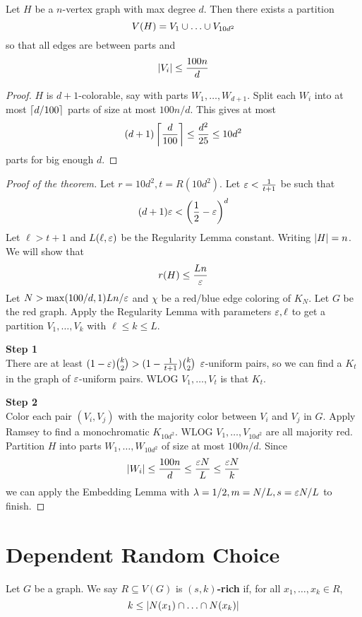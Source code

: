 \documentclass{article}
\begin{document}
\newlec

\begin{lem}
  Let $H$ be a $n$-vertex graph with max degree $d$. Then there exists a partition
  $$V(H) = V_1 \union \dots \union V_{10d^2}$$
  so that all edges are between parts and
  $$\left\lvert V_i\right\rvert \le \frac{100n}d$$
\end{lem}
\begin{proof}
  $H$ is $d + 1$-colorable, say with parts $W_1, \dots, W_{d + 1}$. Split each $W_i$ into at most $\left\lceil d/100\right\rceil$ parts of size at most $100n/d$. This gives at most
  $$(d + 1)\left\lceil \frac d{100}\right\rceil \le \frac{d^2}{25} \le 10d^2$$
  parts for big enough $d$.
\end{proof}

\begin{proof}[Proof of the theorem]
  Let $r = 10d^2, t = R(10d^2)$. Let $\varepsilon < \frac 1{t + 1}$ be such that
  $$(d + 1)\varepsilon < \left(\frac 12 - \varepsilon\right)^d$$
  Let $\ell > t + 1$ and $L(\ell, \varepsilon)$ be the Regularity Lemma constant. Writing $\left\lvert H\right\rvert = n$. We will show that
  $$r(H) \le \frac{Ln}{\varepsilon}$$
  Let $N > \max(100/d, 1) Ln/\varepsilon$ and $\chi$ be a red/blue edge coloring of $K_N$. Let $G$ be the red graph. Apply the Regularity Lemma with parameters $\varepsilon, \ell$ to get a partition $V_1, \dots, V_k$ with $\ell \le k \le L$.

  {\bf Step 1} \\
  There are at least $(1 - \varepsilon)\binom k2 > (1 - \frac 1{t + 1})\binom k2$ $\varepsilon$-uniform pairs, so we can find a $K_t$ in the graph of $\varepsilon$-uniform pairs. WLOG $V_1, \dots, V_t$ is that $K_t$.

  {\bf Step 2} \\
  Color each pair $(V_i, V_j)$ with the majority color between $V_i$ and $V_j$ in $G$. Apply Ramsey to find a monochromatic $K_{10d^2}$. WLOG $V_1, \dots, V_{10d^2}$ are all majority red. Partition $H$ into parts $W_1, \dots, W_{10d^2}$ of size at most $100n/d$. Since
  $$\left\lvert W_i\right\rvert \le \frac{100n}d \le \frac{\varepsilon N}L \le \frac{\varepsilon N}k$$
  we can apply the Embedding Lemma with $\lambda = 1/2, m = N/L, s = \varepsilon N/L$ to finish.
\end{proof}


\section{Dependent Random Choice}

\begin{dfn}
  Let $G$ be a graph. We say $R \subseteq V(G)$ is {\bf $(s, k)$-rich} if, for all $x_1, \dots, x_k \in R$,
  $$k \le \abs{N(x_1) \inter \dots \inter N(x_k)}$$
\end{dfn}
\end{document}
